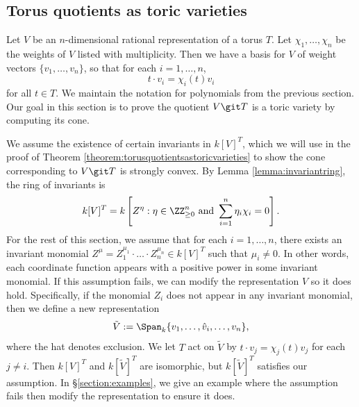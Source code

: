 \documentclass[12pt]{amsart}
\theoremstyle{plain}
\begin{document}
\newpage
\subsection{Torus quotients as toric varieties}\label{section:torusquotientsastoricvarieties}
Let $V$ be an $n$-dimensional rational representation of a torus $T$.
Let $\chi_1, \ldots, \chi_n$ be the weights of $V$ listed with multiplicity.
Then we have a basis for $V$ of weight vectors $\{v_1, \ldots, v_n\}$, so that for each $i=1, \ldots, n$,
$$t \cdot v_i = \chi_i(t) v_i$$
for all $t \in T$.
We maintain the notation for polynomials from the previous section.
Our goal in this section is to prove the quotient $V \git T$ is a toric variety by computing its cone.

We assume the existence of certain invariants in $k[V]^T$, which we will use in the proof of Theorem \ref{theorem:torusquotientsastoricvarieties} to show the cone corresponding to $V \git T$ is strongly convex.
By Lemma \ref{lemma:invariantring}, the ring of invariants is
$$k[V]^T = k \left[Z^\eta : \eta \in \ZZ_{\ge 0}^n \text{ and } \sum_{i=1}^n \eta_i \chi_i = 0 \right].$$
For the rest of this section, we assume that for each $i=1, \ldots, n$, there exists an invariant monomial $Z^\mu = Z_1^{\mu_1} \cdot \ldots \cdot Z_n^{\mu_n} \in k[V]^T$ such that $\mu_i \ne 0$.
In other words, each coordinate function appears with a positive power in some invariant monomial.
If this assumption fails, we can modify the representation $V$ so it does hold.
Specifically, if the monomial $Z_i$ does not appear in any invariant monomial, then we define a new representation
$$\tilde V := \Span_{k}\{v_1, \ldots, \hat v_i, \ldots, v_n\},$$
where the hat denotes exclusion.
We let $T$ act on $\tilde V$ by $t \cdot v_j = \chi_j(t) v_j$ for each $j \ne i$.
Then $k[V]^T$ and $k[\tilde V]^T$ are isomorphic, but $k[\tilde V]^T$ satisfies our assumption.
In \S \ref{section:examples}, we give an example where the assumption fails then modify the representation to ensure it does.
\end{document}
